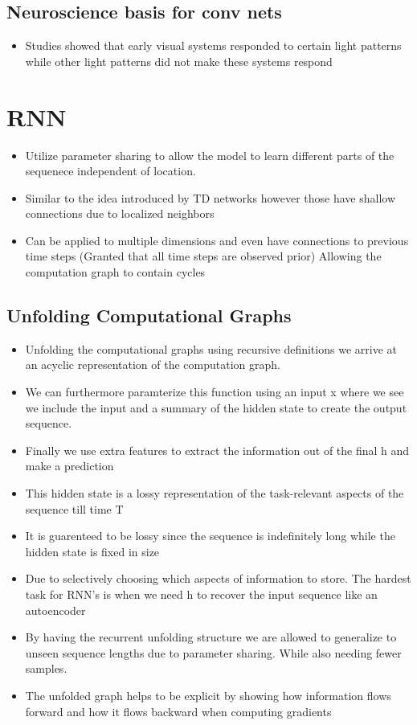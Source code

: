 \documentclass[11pt]{article}
\begin{document}
\subsection{Neuroscience basis for conv nets}
\label{sec:orgaa55079}
\begin{itemize}
\item Studies showed that early visual systems responded to certain light patterns while other light patterns did not make these systems respond
\end{itemize}
\section{RNN}
\label{sec:orgb31fa6d}
\begin{itemize}
\item Utilize parameter sharing to allow the model to learn different parts of the sequenece independent of location.
\item Similar to the idea introduced by TD networks however those have shallow connections due to localized neighbors
\item Can be applied to multiple dimensions and even have connections to previous time steps (Granted that all time steps are observed prior) Allowing the computation graph to contain cycles
\end{itemize}
\subsection{Unfolding Computational Graphs}
\label{sec:org89141c5}
\begin{itemize}
\item Unfolding the computational graphs using recursive definitions we arrive at an acyclic representation of the computation graph.
\item We can furthermore paramterize this function using an input x where we see we include the input and a summary of the hidden state to create the output sequence.
\item Finally we use extra features to extract the information out of the final h and make a prediction
\item This hidden state is a lossy representation of the task-relevant aspects of the sequence till time T
\item It is guarenteed to be lossy since the sequence is indefinitely long while the hidden state is fixed in size
\item Due to selectively choosing which aspects of information to store. The hardest task for RNN's is when we need h to recover the input sequence like an autoencoder
\item By having the recurrent unfolding structure we are allowed to generalize to unseen sequence lengths due to parameter sharing. While also needing fewer samples.
\item The unfolded graph helps to be explicit by showing how information flows forward and how it flows backward when computing gradients
\end{itemize}
\end{document}
